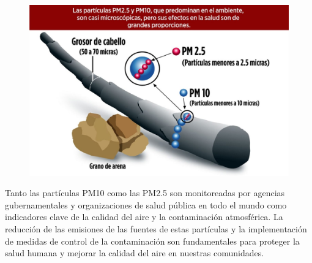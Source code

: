 \documentclass[12pt]{article}
\begin{document}
\begin{figure}[H]
    \centering
    \includegraphics[scale=0.3]{Imagenes/Particulas_PM_01.jpg}
\end{figure}
Tanto las partículas PM10 como las PM2.5 son monitoreadas por agencias gubernamentales y organizaciones de salud pública en todo el mundo como indicadores clave de la calidad del aire y la contaminación atmosférica. La reducción de las emisiones de las fuentes de estas partículas y la implementación de medidas de control de la contaminación son fundamentales para proteger la salud humana y mejorar la calidad del aire en nuestras comunidades.
\end{document}
